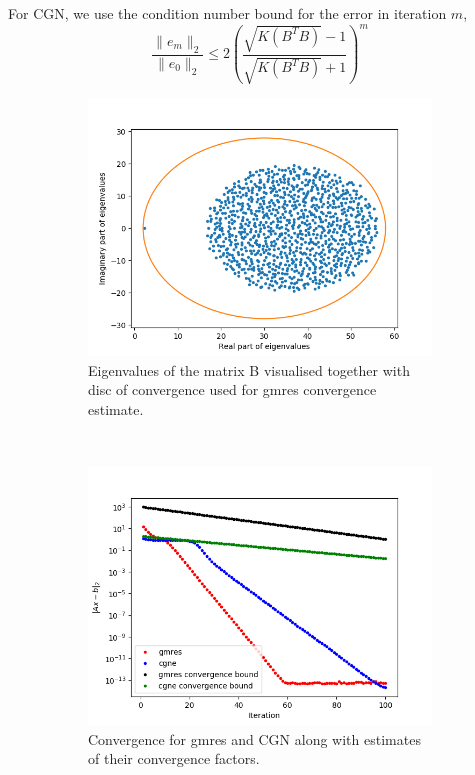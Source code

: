 For CGN, we use the condition number bound for the error in iteration $m$, 
\begin{equation}
\frac{\|e_m\|_2}{\|e_0\|_2}\leq 2\left(\frac{\sqrt{K(B^TB)}-1}{\sqrt{K(B^TB)}+1}\right)^m
\end{equation}
\begin{figure}[h!]
	\centering
	\begin{subfigure}[t]{0.49\textwidth}
		\includegraphics[width=\textwidth]{Eigens.png}
		\caption{Eigenvalues of the matrix B visualised together with disc of convergence used for gmres convergence estimate.}
	\end{subfigure}~
	\begin{subfigure}[t]{0.49\textwidth}
		\includegraphics[width=\textwidth]{error_bound.png}	
		\caption{Convergence for gmres and CGN along with estimates of their convergence factors.}
	\end{subfigure}
	\caption{}
	\label{task6b}
\end{figure} 

